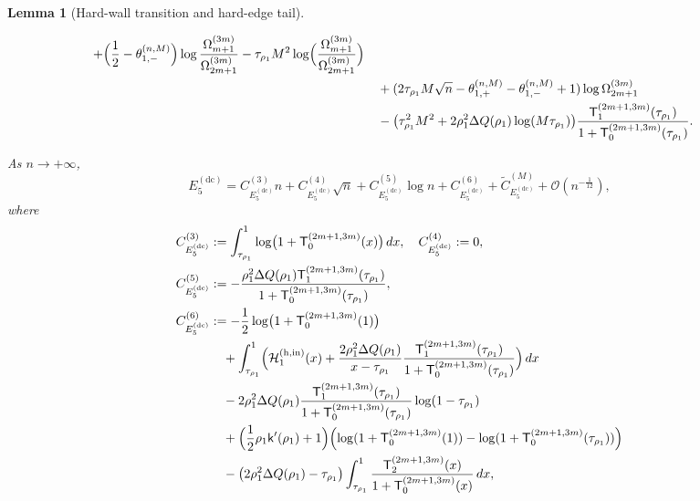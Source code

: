 \documentclass[a4paper]{article}
\newtheorem{lemma}[theorem]{Lemma}
\numberwithin{equation}{section}
\begin{document}
\begin{lemma}[Hard-wall transition and hard-edge tail]
\begin{description}
\begin{align*}
+\Bigl(\frac{1}{2}-\theta_{1,-}^{(n,M)}\Bigr)\log\frac{\Omega_{m+1}^{(3m)}}{\Omega_{2m+1}^{(3m)}}
-\tau_{\rho_1}M^2\log\Bigl(\frac{\Omega_{m+1}^{(3m)}}{\Omega_{2m+1}^{(3m)}}\Bigr)
\\
&\quad
+(2\tau_{\rho_1}M\sqrt{n}-\theta_{1,+}^{(n,M)}-\theta_{1,-}^{(n,M)}+1)\log\Omega_{2m+1}^{(3m)}
\\
&\quad 
-\big(\tau_{\rho_1}^2M^2
+2\rho_1^2\Delta Q(\rho_1)\log(M\tau_{\rho_1})
\big)
\frac{\mathsf{T}_{1}^{(2m+1,3m)}(\tau_{\rho_1})}{1+\mathsf{T}_{0}^{(2m+1,3m)}(\tau_{\rho_1})}.
\end{align*}
    \item[\textup{(ii) Hard-edge tail.}] As $n\to+\infty$,
\begin{equation}
 E_5^{(\mathrm{dc})}
 =
 C_{ E_5^{(\mathrm{dc})}}^{(3)}n+C_{ E_5^{(\mathrm{dc})}}^{(4)}\sqrt{n}+C_{ E_5^{(\mathrm{dc})}}^{(5)}\log n +C_{ E_5^{(\mathrm{dc})}}^{(6)}+\widetilde{C}_{ E_5^{(\mathrm{dc})}}^{(M)}+\mathcal{O}(n^{-\frac{1}{12}}),
\end{equation}
where 
\begin{align*}
C_{ E_5^{(\mathrm{dc})}}^{(3)}
&:=
\int_{\tau_{\rho_1}}^1
\log\bigl(1+\mathsf{T}_{0}^{(2m+1,3m)}(x)\bigr)\,dx, 
\quad
C_{ E_5^{(\mathrm{dc})}}^{(4)}
:=0,
\\
C_{ E_5^{(\mathrm{dc})}}^{(5)}
&:=
-
\frac{\rho_1^2\Delta Q(\rho_1)\mathsf{T}_{1}^{(2m+1,3m)}(\tau_{\rho_1})}{1+\mathsf{T}_{0}^{(2m+1,3m)}(\tau_{\rho_1})},
\\
C_{ E_5^{(\mathrm{dc})}}^{(6)}
&:=
-
\frac{1}{2}\log\bigl(1+\mathsf{T}_{0}^{(2m+1,3m)}(1)\bigr)
\\
&\quad 
+
\int_{\tau_{\rho_1}}^{1}
\Bigl(
\mathcal{H}_1^{(\mathrm{h,in})}(x)
+\frac{2\rho_1^2\Delta Q(\rho_1)}{x-\tau_{\rho_1}}\frac{\mathsf{T}_{1}^{(2m+1,3m)}(\tau_{\rho_1})}{1+\mathsf{T}_{0}^{(2m+1,3m)}(\tau_{\rho_1})}\Bigr)\,dx
\\
&\quad 
-
2\rho_1^2\Delta Q(\rho_1)
\frac{\mathsf{T}_{1}^{(2m+1,3m)}(\tau_{\rho_1})}{1+\mathsf{T}_{0}^{(2m+1,3m)}(\tau_{\rho_1})}
\log(1-\tau_{\rho_1})
\\
&\quad 
+\Bigl(\frac{1}{2}\rho_1\mathsf{k}'(\rho_1)+1\Bigr)
\Bigl(\log(1+\mathsf{T}_0^{(2m+1,3m)}(1))-\log(1+\mathsf{T}_0^{(2m+1,3m)}(\tau_{\rho_1}))
\Bigr)
\\
&\quad
-
\bigl(2\rho_1^2\Delta Q(\rho_1)-\tau_{\rho_1}\bigr)
\int_{\tau_{\rho_1}}^{1}
\frac{\mathsf{T}_{2}^{(2m+1,3m)}(x)}{1+\mathsf{T}_{0}^{(2m+1,3m)}(x)}\,dx,

\end{align*}
\end{description}
\end{lemma}
\end{document}

